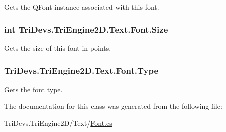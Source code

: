 Gets the Q\-Font instance associated with this font. 

\hypertarget{class_tri_devs_1_1_tri_engine2_d_1_1_text_1_1_font_a17657517dee9abfa8c1c59c8446b8796}{
\subsubsection[{Size}]{\setlength{\rightskip}{0pt plus 5cm}int Tri\-Devs.\-Tri\-Engine2\-D.\-Text.\-Font.\-Size\hspace{0.3cm}{\ttfamily [get]}}}\label{class_tri_devs_1_1_tri_engine2_d_1_1_text_1_1_font_a17657517dee9abfa8c1c59c8446b8796}


Gets the size of this font in points. 

\hypertarget{class_tri_devs_1_1_tri_engine2_d_1_1_text_1_1_font_a7903acb278fd03aa45ff8355e0ab0c23}{
\subsubsection[{Type}]{ Tri\-Devs.\-Tri\-Engine2\-D.\-Text.\-Font.\-Type\hspace{0.3cm}{\ttfamily [get]}}}\label{class_tri_devs_1_1_tri_engine2_d_1_1_text_1_1_font_a7903acb278fd03aa45ff8355e0ab0c23}


Gets the font type. 



The documentation for this class was generated from the following file\-:\begin{DoxyCompactItemize}
\item 
Tri\-Devs.\-Tri\-Engine2\-D/\-Text/\hyperlink{_font_8cs}{Font.\-cs}\end{DoxyCompactItemize}
